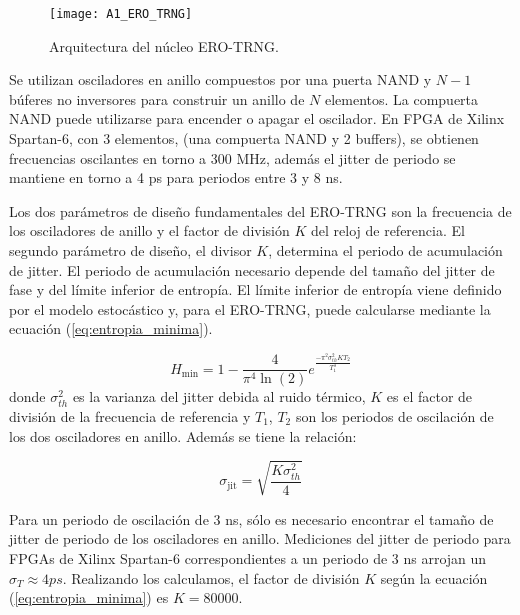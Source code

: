 				\begin{figure}[hbtp]
					\caption{Arquitectura del núcleo ERO-TRNG.}
					\centering
					\texttt{[image: A1\_ERO\_TRNG]}
					\label{fig:A1_ERO_TRNG}
				\end{figure}
                
            Se utilizan osciladores en anillo compuestos por una puerta NAND y $N - 1$ búferes no inversores para construir un anillo de $N$ elementos. La compuerta NAND puede utilizarse para encender o apagar el oscilador. En FPGA de Xilinx Spartan-6, con 3 elementos, (una compuerta NAND y 2 buffers), se obtienen frecuencias oscilantes en torno a 300 MHz, además el jitter de periodo se mantiene en torno a 4 ps para periodos entre 3 y 8 ns. 

            Los dos parámetros de diseño fundamentales del ERO-TRNG son la frecuencia de los osciladores de anillo y el factor de división $K$ del reloj de referencia. El segundo parámetro de diseño, el divisor $K$, determina el periodo de acumulación de jitter. El periodo de acumulación necesario depende del tamaño del jitter  de fase y del límite inferior de entropía. El límite inferior de entropía viene definido por el modelo estocástico y, para el ERO-TRNG, puede calcularse mediante la ecuación (\ref{eq:entropia_minima}).

            \begin{equation}
                H_{\text{min}}  = 1 - \frac{4}{\pi ^{4} \ln (2) } e^{ \frac{-\pi^{2} \sigma_{th}^{2} K T_{2}}{T_{1}^{3}} } 
                \label{eq:entropia_minima}
            \end{equation}
            donde $\sigma_{th}^{2}$ es la varianza del jitter debida al ruido térmico, $K$ es el factor de división de la frecuencia de referencia y $T_{1}$, $T_{2}$ son los periodos de oscilación de los dos osciladores en anillo. Además se tiene la relación:

            \begin{equation}
                \sigma_{\text{jit}} = \sqrt{ \frac{K \sigma_{th}^{2} }{4} }
                \label{eq:relacion}
            \end{equation}

            Para un periodo de oscilación de 3 ns, sólo es necesario encontrar el tamaño de jitter de periodo de los osciladores en anillo. Mediciones del jitter de periodo para FPGAs de Xilinx Spartan-6 correspondientes a un periodo de 3 ns arrojan un $\sigma_{T} \approx 4ps$. Realizando los calculamos, el factor de división $K$ según la ecuación (\ref{eq:entropia_minima}) es $K = 80 000$.

